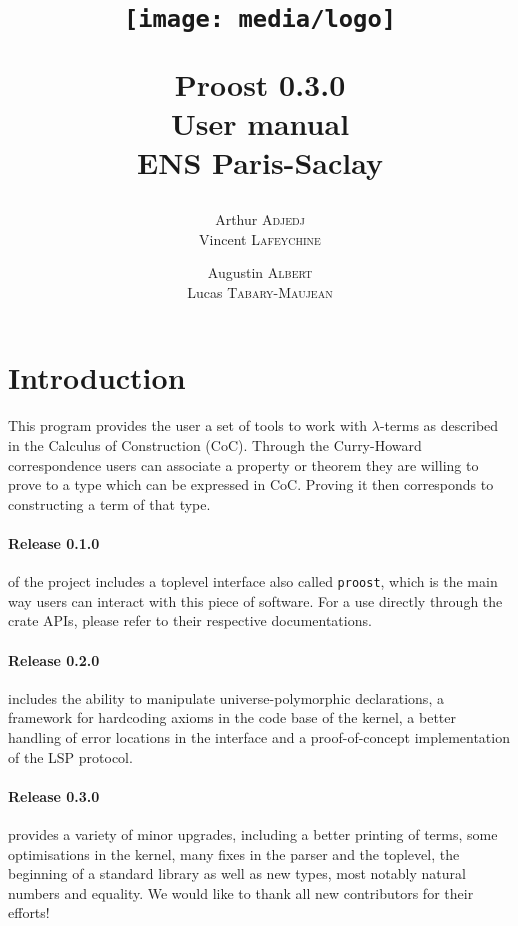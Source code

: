 \documentclass[twocolumn]{article}
\author{
  Arthur \textsc{Adjedj}\\
  Vincent \textsc{Lafeychine} \and
  Augustin \textsc{Albert} \\
  Lucas \textsc{Tabary-Maujean}
}
\title{
  \texttt{[image: media/logo]}

	\textbf{Proost 0.3.0} \\
	User manual
  \\[1\baselineskip]\normalsize ENS Paris-Saclay
}
\begin{document}
\maketitle
\thispagestyle{fancy}

\section{Introduction}
This program provides the user a set of tools to work with \(\lambda\)-terms as
described in the Calculus of Construction (CoC). Through the Curry-Howard
correspondence users can associate a property or theorem they are willing to
prove to a type which can be expressed in CoC. Proving it then corresponds to
constructing a term of that type.

\paragraph{Release 0.1.0} of the project includes a toplevel interface also called
\texttt{proost}, which is the main way users can interact with this piece of
software. For a use directly through the crate APIs, please refer to their
respective documentations.

\paragraph{Release 0.2.0} includes the ability to manipulate universe-polymorphic declarations, a
framework for hardcoding axioms in the code base of the kernel, a better handling
of error locations in the interface and a proof-of-concept implementation of the
LSP protocol.

\paragraph{Release 0.3.0} provides a variety of minor upgrades, including a better printing
of terms, some optimisations in the kernel, many fixes in the parser and the
toplevel, the beginning of a standard library as well as new types, most notably
natural numbers and equality. We would like to thank all new contributors for
their efforts!
\end{document}
